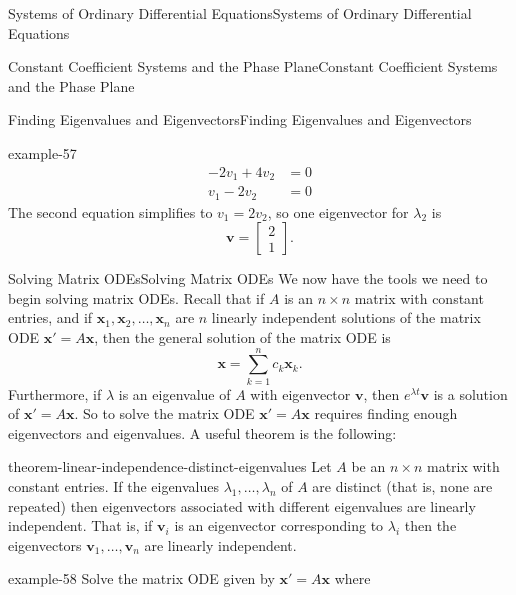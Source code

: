 \documentclass[10pt,]{book}
\numberwithin{equation}{section}
\renewcommand{\vec}[1]{\mathbf{#1}}
\newcommand{\amp}{&}
\begin{document}
\begin{chapterptx}{Systems of Ordinary Differential Equations}{}{Systems of Ordinary Differential Equations}{}{}
\begin{sectionptx}{Constant Coefficient Systems and the Phase Plane}{}{Constant Coefficient Systems and the Phase Plane}{}{}
\begin{subsectionptx}{Finding Eigenvalues and Eigenvectors}{}{Finding Eigenvalues and Eigenvectors}{}{}
\begin{example}{}{example-57}
\begin{align*}
-2v_{1}+4v_{2} \amp = 0\\
v_{1} - 2v_{2} \amp = 0
\end{align*}
The second equation simplifies to \(v_{1} = 2v_{2}\), so one eigenvector for \(\lambda_{2}\) is%
\begin{equation*}
\vec{v} = \begin{bmatrix}2 \\ 1\end{bmatrix}.
\end{equation*}
%
\end{example}
\end{subsectionptx}
%
%
\typeout{************************************************}
\typeout{************************************************}
%
\begin{subsectionptx}{Solving Matrix ODEs}{}{Solving Matrix ODEs}{}{}\label{subsection-solving-matrix-odes}
\hypertarget{p-343}{}%
We now have the tools we need to begin solving matrix ODEs. Recall that if \(A\) is an \(n\times n\) matrix with constant entries, and if \(\vec{x}_{1},\vec{x}_{2},\ldots,\vec{x}_{n}\) are \(n\) linearly independent solutions of the matrix ODE \(\vec{x}'=A\vec{x}\), then the general solution of the matrix ODE is%
\begin{equation*}
\vec{x} = \sum_{k=1}^{n}c_{k}\vec{x}_{k}.
\end{equation*}
Furthermore, if \(\lambda\) is an eigenvalue of \(A\) with eigenvector \(\vec{v}\), then \(e^{\lambda t}\vec{v}\) is a solution of \(\vec{x}'=A\vec{x}\). So to solve the matrix ODE \(\vec{x}'=A\vec{x}\) requires finding enough eigenvectors and eigenvalues. A useful theorem is the following:%
\begin{theorem}{}{}{theorem-linear-independence-distinct-eigenvalues}%
\hypertarget{p-344}{}%
Let \(A\) be an \(n\times n\) matrix with constant entries. If the eigenvalues \(\lambda_{1},\ldots,\lambda_{n}\) of \(A\) are distinct (that is, none are repeated) then eigenvectors associated with different eigenvalues are linearly independent. That is, if \(\vec{v}_{i}\) is an eigenvector corresponding to \(\lambda_{i}\) then the eigenvectors \(\vec{v}_{1},\ldots,\vec{v}_{n}\) are linearly independent.%
\end{theorem}
\begin{example}{}{example-58}%
\hypertarget{p-345}{}%
Solve the matrix ODE given by \(\vec{x}' = A\vec{x}\) where%
\begin{equation*}

\end{equation*}
\end{example}
\end{subsectionptx}
\end{sectionptx}
\end{chapterptx}
\end{document}
